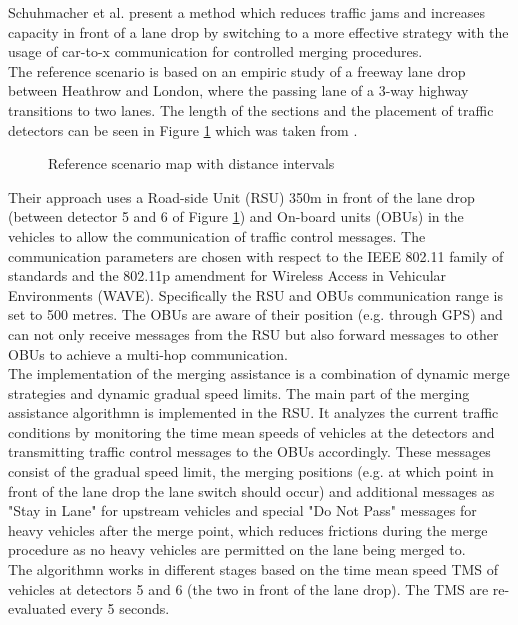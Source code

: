 \documentclass{sig-alternate}
\begin{document}
Schuhmacher et al. present a method which reduces traffic jams and increases capacity in front of a lane drop by switching to a more effective strategy with the usage of car-to-x communication for controlled merging procedures.\\ The reference scenario is based on an empiric study\cite{bertini2005empirical} of a freeway lane drop between Heathrow and London, where the passing lane of a 3-way highway transitions to two lanes. The length of the sections and the placement of traffic detectors can be seen in Figure \ref{fig:schuhmacher1} which was taken from \cite {1614269.1614274}. \\
\begin{figure} [h]
\centering
{}
\caption{Reference scenario map with distance intervals}
\label{fig:schuhmacher1}
\end{figure}
Their approach uses a Road-side Unit (RSU) 350m in front of the lane drop (between detector 5 and 6 of Figure \ref{fig:schuhmacher1}) and On-board units (OBUs) in the vehicles to allow the communication of traffic control messages. The communication parameters are chosen with respect to the IEEE 802.11 family of standards and the 802.11p amendment for Wireless Access in Vehicular Environments (WAVE). Specifically the RSU and OBUs communication range is set to 500 metres. The OBUs are aware of their position (e.g. through GPS) and can not only receive messages from the RSU but also forward messages to other OBUs to achieve a multi-hop communication. \\
The implementation of the merging assistance is a combination of dynamic merge strategies and dynamic gradual speed limits. The main part of the merging assistance algorithmn is implemented in the RSU. It analyzes the current traffic conditions by monitoring the time mean speeds of vehicles at the detectors and transmitting traffic control messages  to the OBUs accordingly. These messages consist of the gradual speed limit, the merging positions (e.g. at which point in front of the lane drop the lane switch should occur) and additional messages as "Stay in Lane"  for upstream vehicles and special  "Do Not Pass" messages for heavy vehicles after the merge point, which reduces frictions during the merge procedure as no heavy vehicles are permitted on the lane being merged to. \\
The algorithmn works in different stages based on the time mean speed TMS of vehicles at detectors 5 and 6 (the two in front of the lane drop). The TMS are re-evaluated every 5 seconds.
\end{document}
